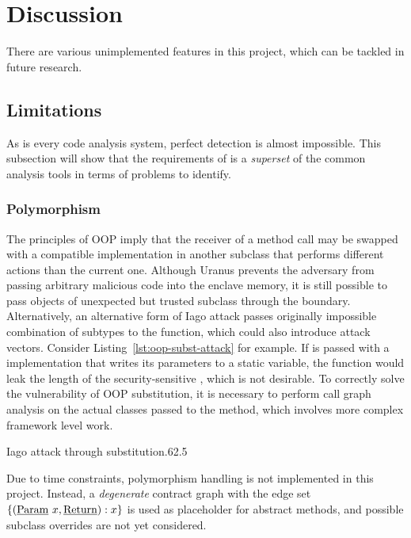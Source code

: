 \section{Discussion}\label{sec:discussion}
There are various unimplemented features in this project,
which can be tackled in future research.

\subsection{Limitations}\label{subsec:difficulties-and-limitations}
As is every code analysis system,
perfect detection is almost impossible.
This subsection will show that
the requirements of \pname{} is a \emph{superset} of the common analysis tools
in terms of problems to identify.

\subsubsection{Polymorphism}\label{subsubsec:polymorphism}
The principles of \ac{OOP} imply that the receiver of a method call
may be swapped with a compatible implementation in another subclass
that performs different actions than the current one.
Although Uranus prevents the adversary
from passing arbitrary malicious code into the enclave memory,
it is still possible to pass objects of unexpected but trusted subclass
through the  boundary.
Alternatively, an alternative form of Iago attack
passes originally impossible combination of subtypes to the function,
which could also introduce attack vectors.
Consider Listing~\ref{lst:oop-subst-attack} for example.
If  is passed with a  implementation
that writes its parameters to a static variable,
the function would leak the length of the security-sensitive ,
which is not desirable.
To correctly solve the vulnerability of \ac{OOP} substitution,
it is necessary to perform call graph analysis on the actual classes passed to the method,
which involves more complex framework level work.

{Iago attack through substitution}{.6}{2.5}

Due to time constraints,
polymorphism handling is not implemented in this project.
Instead, a \emph{degenerate} contract graph
with the edge set $\left\{(\text{\underline{Param}}~x, \text{\underline{Return}}) : x\right\}$
is used as placeholder for abstract methods,
and possible subclass overrides are not yet considered.

